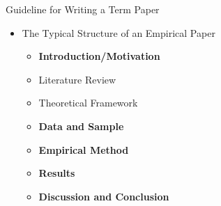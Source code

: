 \documentclass[dvipsnames,hyperref={pdfpagelabels=false}]{beamer}
\begin{document}



\begin{frame}{Guideline for Writing a Term Paper}
\begin{itemize} 
\item The Typical Structure of an Empirical Paper
\vspace{0.3cm}
\begin{itemize} 
\item[1] \textbf{Introduction/Motivation}
\vspace{0.3cm}
\item[2] Literature Review
\vspace{0.3cm}
\item[3] Theoretical Framework 
\vspace{0.3cm}
\item[4] \textbf{Data and Sample}
\vspace{0.3cm}
\item[5] \textbf{Empirical Method}
\vspace{0.3cm}
\item[6] \textbf{Results} 
\vspace{0.3cm}
\item[7] \textbf{Discussion and Conclusion}
\end{itemize}

\end{itemize}
\end{frame}
\end{document}
